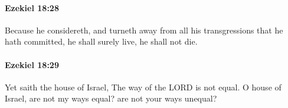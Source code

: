 		\paragraph{Ezekiel 18:28} %
			\label{EZEKIEL-18-28}

			Because he considereth, and turneth away from all his transgressions that he hath committed, he shall surely live, he shall not die.


		\paragraph{Ezekiel 18:29} %
			\label{EZEKIEL-18-29}

			Yet saith the house of Israel, The way of the LORD is not equal. O house of Israel, are not my ways equal? are not your ways unequal?


